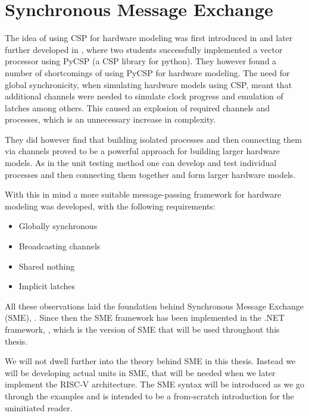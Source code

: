 \section{Synchronous Message Exchange}
    The idea of using CSP for hardware modeling was first introduced in \citet{BPUSimulator2013} and later further developed in \cite{PyCSPFPGA}, where two students successfully implemented a vector processor using PyCSP (a CSP library for python). They however found a number of shortcomings of using PyCSP for hardware modeling. The need for global synchronicity, when simulating hardware models using CSP, meant that additional channels were needed to simulate clock progress and emulation of latches among others. This caused an explosion of required channels and processes, which is an unnecessary increase in complexity.
    
    They did however find that building isolated processes and then connecting them via channels proved to be a powerful approach for building larger hardware models. As in the unit testing method one can develop and test individual processes and then connecting them together and form larger hardware models.
    
    With this in mind a more suitable message-passing framework for hardware modeling was developed, with the following requirements:
    
    \begin{itemize}
        \item Globally synchronous
        \item Broadcasting channels
        \item Shared nothing
        \item Implicit latches
    \end{itemize} 
    
    All these observations laid the foundation behind Synchronous Message Exchange (SME),  \citet{vinter2014synchronous}. 
    Since then the SME framework has been implemented in the .NET framework, \citet{skovhede2016building}, which is the version of SME that will be used throughout this thesis.
    
    We will not dwell further into the theory behind SME in this thesis. Instead we will be developing actual units in SME, that will be needed when we later implement the RISC-V architecture. The SME syntax will be introduced as we go through the examples and is intended to be a from-scratch introduction for the uninitiated reader. 
    

